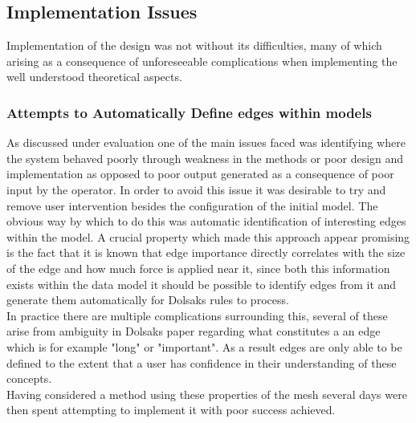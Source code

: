 
\subsection{Implementation Issues}
Implementation of the design was not without its difficulties, many of which arising as a consequence of unforeseeable complications when implementing the well understood theoretical aspects.


\subsubsection{Attempts to Automatically Define edges within models}
As discussed under evaluation one of the main issues faced was identifying where the system behaved poorly through weakness in the methods or poor design and implementation as opposed to poor output generated as a consequence of poor input by the operator. In order to avoid this issue it was desirable to try and remove user intervention besides the configuration of the initial model. The obvious way by which to do this was automatic identification of interesting edges within the model. A crucial property which made this approach appear promising is the fact that it is known that edge importance directly correlates with the size of the edge and how much force is applied near it, since both this information exists within the data model it should be possible to identify edges from it and generate them automatically for Dolsaks rules to process.  \\


\noindent
In practice there are multiple complications surrounding this, several of these arise from ambiguity in Dolsaks paper regarding what constitutes a an edge which is for example "long" or "important". As a result edges are only able to be defined to the extent that a user has confidence in their understanding of these concepts. \\ 


Having considered a method using these properties of the mesh several days were then spent attempting to implement it with poor success achieved.
